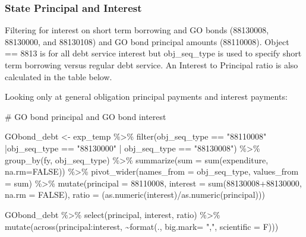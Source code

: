 \documentclass[
  letterpaper,
  DIV=11,
  numbers=noendperiod]{scrreport}
\newenvironment{Shaded}{\begin{snugshade}}{\end{snugshade}}
\newcommand{\AttributeTok}[1]{\textcolor[rgb]{0.40,0.45,0.13}{#1}}
\newcommand{\CommentTok}[1]{\textcolor[rgb]{0.37,0.37,0.37}{#1}}
\newcommand{\ConstantTok}[1]{\textcolor[rgb]{0.56,0.35,0.01}{#1}}
\newcommand{\FunctionTok}[1]{\textcolor[rgb]{0.28,0.35,0.67}{#1}}
\newcommand{\NormalTok}[1]{\textcolor[rgb]{0.00,0.23,0.31}{#1}}
\newcommand{\OtherTok}[1]{\textcolor[rgb]{0.00,0.23,0.31}{#1}}
\newcommand{\SpecialCharTok}[1]{\textcolor[rgb]{0.37,0.37,0.37}{#1}}
\newcommand{\StringTok}[1]{\textcolor[rgb]{0.13,0.47,0.30}{#1}}
\begin{document}
\hypertarget{state-principal-and-interest}{%
\subsubsection{State Principal and
Interest}\label{state-principal-and-interest}}

Filtering for interest on short term borrowing and GO bonds (88130008,
88130000, and 88130108) and GO bond principal amounts (88110008). Object
== 8813 is for all debt service interest but obj\_seq\_type is used to
specify short term borrowing versus regular debt service. An Interest to
Principal ratio is also calculated in the table below.

Looking only at general obligation principal payments and interest
payments:

\begin{Shaded}
\begin{Highlighting}[]
\CommentTok{\# GO bond principal and GO bond interest}

\NormalTok{GObond\_debt }\OtherTok{\textless{}{-}}\NormalTok{ exp\_temp }\SpecialCharTok{\%\textgreater{}\%} 
  \FunctionTok{filter}\NormalTok{(obj\_seq\_type }\SpecialCharTok{==} \StringTok{"88110008"} \SpecialCharTok{|}\NormalTok{obj\_seq\_type }\SpecialCharTok{==} \StringTok{"88130000"} \SpecialCharTok{|}\NormalTok{ obj\_seq\_type }\SpecialCharTok{==} \StringTok{"88130008"}\NormalTok{) }\SpecialCharTok{\%\textgreater{}\%} 
  \FunctionTok{group\_by}\NormalTok{(fy, obj\_seq\_type) }\SpecialCharTok{\%\textgreater{}\%} 
  \FunctionTok{summarize}\NormalTok{(}\AttributeTok{sum =} \FunctionTok{sum}\NormalTok{(expenditure, }\AttributeTok{na.rm=}\ConstantTok{FALSE}\NormalTok{)) }\SpecialCharTok{\%\textgreater{}\%} 
  \FunctionTok{pivot\_wider}\NormalTok{(}\AttributeTok{names\_from =}\NormalTok{ obj\_seq\_type, }\AttributeTok{values\_from =}\NormalTok{ sum) }\SpecialCharTok{\%\textgreater{}\%} 
  \FunctionTok{mutate}\NormalTok{(}\AttributeTok{principal =} \StringTok{\textasciigrave{}}\AttributeTok{88110008}\StringTok{\textasciigrave{}}\NormalTok{,}
         \AttributeTok{interest =} \FunctionTok{sum}\NormalTok{(}\StringTok{\textasciigrave{}}\AttributeTok{88130008}\StringTok{\textasciigrave{}}\SpecialCharTok{+}\StringTok{\textasciigrave{}}\AttributeTok{88130000}\StringTok{\textasciigrave{}}\NormalTok{, }\AttributeTok{na.rm =} \ConstantTok{FALSE}\NormalTok{),}
         \AttributeTok{ratio =}\NormalTok{ (}\FunctionTok{as.numeric}\NormalTok{(interest)}\SpecialCharTok{/}\FunctionTok{as.numeric}\NormalTok{(principal)))}

\NormalTok{GObond\_debt }\SpecialCharTok{\%\textgreater{}\%} 
  \FunctionTok{select}\NormalTok{(principal, interest, ratio) }\SpecialCharTok{\%\textgreater{}\%}
  \FunctionTok{mutate}\NormalTok{(}\FunctionTok{across}\NormalTok{(principal}\SpecialCharTok{:}\NormalTok{interest, }\SpecialCharTok{\textasciitilde{}}\FunctionTok{format}\NormalTok{(., }\AttributeTok{big.mark=} \StringTok{","}\NormalTok{, }\AttributeTok{scientific =}\NormalTok{ F)))}
\end{Highlighting}
\end{Shaded}
\end{document}
